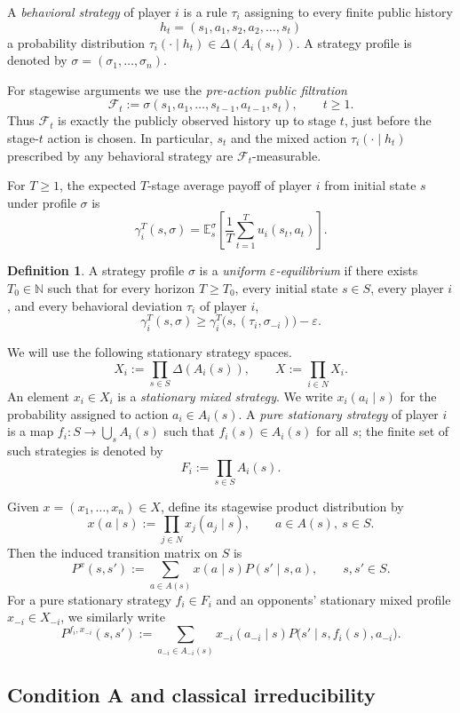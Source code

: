 \documentclass[11pt]{article}
\theoremstyle{definition}
\newtheorem{definition}[theorem]{Definition}
\newcommand{\E}{\mathbb{E}}
\newcommand{\1}{\mathbf{1}}
\begin{document}
A \emph{behavioral strategy} of player $i$ is a rule $\tau_i$ assigning to every finite public history
\[
h_t=(s_1,a_1,s_2,a_2,\dots,s_t)
\]
a probability distribution $\tau_i(\cdot\mid h_t)\in\Delta(A_i(s_t))$. A strategy profile is denoted by $\sigma=(\sigma_1,\dots,\sigma_n)$.

For stagewise arguments we use the \emph{pre-action public filtration}
\[
\mathcal F_t:=\sigma(s_1,a_1,\dots,s_{t-1},a_{t-1},s_t),\qquad t\ge1.
\]
Thus $\mathcal F_t$ is exactly the publicly observed history up to stage $t$, just before the stage-$t$ action is chosen. In particular, $s_t$ and the mixed action $\tau_i(\cdot\mid h_t)$ prescribed by any behavioral strategy are $\mathcal F_t$-measurable.

For $T\ge1$, the expected $T$-stage average payoff of player $i$ from initial state $s$ under profile $\sigma$ is
\[
\gamma_i^T(s,\sigma)
=\E_s^{\sigma}\!\left[\frac1T\sum_{t=1}^{T}u_i(s_t,a_t)\right].
\]

\begin{definition}
A strategy profile $\sigma$ is a \emph{uniform $\varepsilon$-equilibrium} if there exists $T_0\in\mathbb N$ such that for every horizon $T\ge T_0$, every initial state $s\in S$, every player $i$, and every behavioral deviation $\tau_i$ of player $i$,
\[
\gamma_i^T(s,\sigma)\ge\gamma_i^T\bigl(s,(\tau_i,\sigma_{-i})\bigr)-\varepsilon.
\]
\end{definition}

We will use the following stationary strategy spaces.
\[
X_i:=\prod_{s\in S}\Delta(A_i(s)),\qquad X:=\prod_{i\in N}X_i.
\]
An element $x_i\in X_i$ is a \emph{stationary mixed strategy}. We write $x_i(a_i\mid s)$ for the probability assigned to action $a_i\in A_i(s)$. A \emph{pure stationary strategy} of player $i$ is a map $f_i:S\to\bigcup_{s}A_i(s)$ such that $f_i(s)\in A_i(s)$ for all $s$; the finite set of such strategies is denoted by
\[
F_i:=\prod_{s\in S}A_i(s).
\]

Given $x=(x_1,\dots,x_n)\in X$, define its stagewise product distribution by
\[
x(a\mid s):=\prod_{j\in N}x_j(a_j\mid s),\qquad a\in A(s),\ s\in S.
\]
Then the induced transition matrix on $S$ is
\[
P^x(s,s'):=\sum_{a\in A(s)}x(a\mid s)P(s'\mid s,a),\qquad s,s'\in S.
\]
For a pure stationary strategy $f_i\in F_i$ and an opponents' stationary mixed profile $x_{-i}\in X_{-i}$, we similarly write
\[
P^{f_i,x_{-i}}(s,s'):=\sum_{a_{-i}\in A_{-i}(s)}x_{-i}(a_{-i}\mid s)
P\bigl(s'\mid s,f_i(s),a_{-i}\bigr).
\]

\subsection{Condition A and classical irreducibility}
\end{document}
